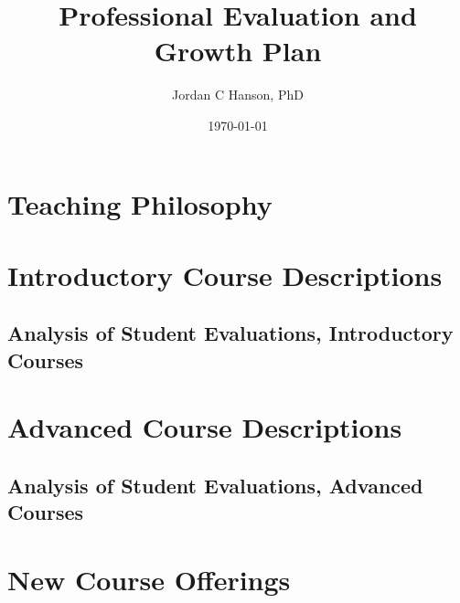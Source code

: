 \documentclass[10pt,oneside]{book}
\title{Professional Evaluation and Growth Plan}
\author{Jordan C Hanson, PhD}
\date{\today}
\begin{document}
\maketitle
\tableofcontents

\clearpage

\section{Teaching Philosophy}

\begin{flushleft}

\end{flushleft}

\clearpage

\section{Introductory Course Descriptions}

\begin{flushleft}

\end{flushleft}

\clearpage

\subsection{Analysis of Student Evaluations, Introductory Courses}

\begin{flushleft}

\end{flushleft}

\section{Advanced Course Descriptions}

\begin{flushleft}

\end{flushleft}

\subsection{Analysis of Student Evaluations, Advanced Courses}

\begin{flushleft}

\end{flushleft}

\section{New Course Offerings}

\begin{flushleft}

\end{flushleft}



\end{document}
